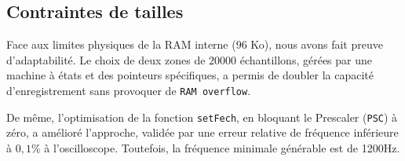 \documentclass{article}
\begin{document}
\subsection{Contraintes de tailles}
Face aux limites physiques de la RAM interne ($96$ Ko), nous avons fait preuve d'adaptabilité. Le choix de deux zones de $20000$ échantillons, gérées par une machine à états et des pointeurs spécifiques, a permis de doubler la capacité d'enregistrement sans provoquer de \texttt{RAM overflow}. 

De même, l'optimisation de la fonction \texttt{setFech}, en bloquant le Prescaler (\texttt{PSC}) à zéro, a amélioré l'approche, validée par une erreur relative de fréquence inférieure à $0,1$\% à l'oscilloscope. Toutefois, la fréquence minimale générable est de 1200Hz.
\end{document}
